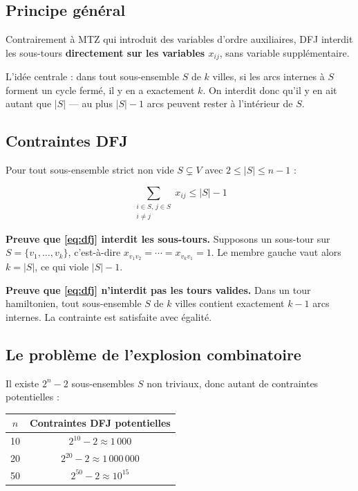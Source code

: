 \documentclass[12pt, a4paper]{article}
\begin{document}
\subsection{Principe général}

Contrairement à MTZ qui introduit des variables d'ordre auxiliaires, DFJ
interdit les sous-tours \textbf{directement sur les variables $x_{ij}$}, sans
variable supplémentaire.

L'idée centrale : dans tout sous-ensemble $S$ de $k$ villes, si les arcs
internes à $S$ forment un cycle fermé, il y en a exactement $k$.
On interdit donc qu'il y en ait autant que $|S|$ --- au plus $|S|-1$ arcs
peuvent rester à l'intérieur de $S$.

\subsection{Contraintes DFJ}

Pour tout sous-ensemble strict non vide $S \subsetneq V$ avec $2 \leq |S| \leq n-1$ :

\begin{equation}
  \sum_{\substack{i \in S,\, j \in S \\ i \neq j}} x_{ij} \leq |S| - 1
  \label{eq:dfj}
\end{equation}

\textbf{Preuve que \eqref{eq:dfj} interdit les sous-tours.}
Supposons un sous-tour sur $S = \{v_1, \ldots, v_k\}$, c'est-à-dire
$x_{v_1 v_2} = \cdots = x_{v_k v_1} = 1$.
Le membre gauche vaut alors $k = |S|$, ce qui viole $|S| - 1$.

\textbf{Preuve que \eqref{eq:dfj} n'interdit pas les tours valides.}
Dans un tour hamiltonien, tout sous-ensemble $S$ de $k$ villes contient
exactement $k-1$ arcs internes. La contrainte est satisfaite avec égalité.

\subsection{Le problème de l'explosion combinatoire}

Il existe $2^n - 2$ sous-ensembles $S$ non triviaux, donc autant de contraintes
potentielles :

\begin{center}
\begin{tabular}{cc}
  \toprule
  $n$ & Contraintes DFJ potentielles \\
  \midrule
  10 & $2^{10} - 2 \approx 1\,000$ \\
  20 & $2^{20} - 2 \approx 1\,000\,000$ \\
  50 & $2^{50} - 2 \approx 10^{15}$ \\
  \bottomrule
\end{tabular}
\end{center}
\end{document}
